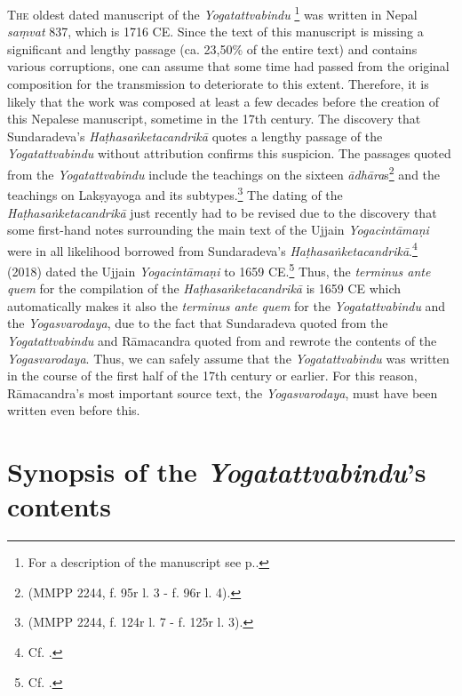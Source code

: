 \lettrine[lines=2, lhang=0.2, loversize=0.25]{T}{he} oldest dated manuscript of the \textit{Yogatattvabindu} \footnote{For a description of the manuscript see  p.\pageref{n1description}.} was written in Nepal \textit{saṃvat} 837, which is 1716 CE. Since the text of this manuscript is missing a significant and lengthy passage (ca. 23,50\% of the entire text) and contains various corruptions, one can assume that some time had passed from the original composition for the transmission to deteriorate to this extent. Therefore, it is likely that the work was composed at least a few decades before the creation of this Nepalese manuscript, sometime in the 17th century. The discovery that Sundaradeva's \textit{Haṭhasaṅketacandrikā} quotes a lengthy passage of the \textit{Yogatattvabindu} without attribution confirms this suspicion. The passages quoted from the \textit{Yogatattvabindu} include the teachings on the sixteen \textit{ādhāra}s\footnote{ (MMPP 2244, f. 95r l. 3 - f. 96r l. 4).} and the teachings on Lakṣyayoga and its subtypes.\footnote{ (MMPP 2244, f. 124r l. 7 - f. 125r l. 3).} The dating of the \textit{Haṭhasaṅketacandrikā} just recently had to be revised due to the discovery that some first-hand notes surrounding the main text of the Ujjain \textit{Yogacintāmaṇi} were in all likelihood borrowed from Sundaradeva's \textit{Haṭhasaṅketacandrikā}.\footnote{Cf. \citeauthor[2024: 52-54]{birch2024}.} \citeauthor{birch2018proliferation} (2018) dated the Ujjain \textit{Yogacintāmaṇi} to 1659 CE.\footnote{Cf. \citeauthor[2018: 50, n. 111]{birch2018proliferation}.} Thus, the \textit{terminus ante quem} for the compilation of the \textit{Haṭhasaṅketacandrikā} is 1659 CE which automatically makes it also the \textit{terminus ante quem} for the \textit{Yogatattvabindu} and the \textit{Yogasvarodaya}, due to the fact that Sundaradeva quoted from the \textit{Yogatattvabindu} and Rāmacandra quoted from and rewrote the contents of the \textit{Yogasvarodaya}. Thus, we can safely assume that the \textit{Yogatattvabindu} was written in the course of the first half of the 17th century or earlier. For this reason, Rāmacandra's most important source text, the \textit{Yogasvarodaya}, must have been written even before this.

\section{Synopsis of the \emph{Yogatattvabindu}'s contents}

